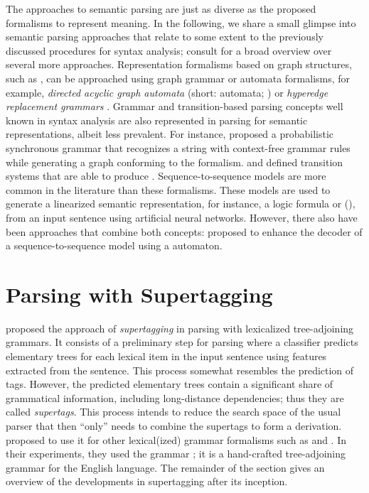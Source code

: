 \documentclass[../document.tex]{subfiles}
\begin{document}
    The approaches to semantic parsing are just as diverse as the proposed formalisms to represent meaning.
    In the following, we share a small glimpse into semantic parsing approaches that relate to some extent to the previously discussed procedures for syntax analysis; consult \citet{kamath2018survey} for a broad overview over several more approaches.
    Representation formalisms based on graph structures, such as , can be approached using graph grammar or automata formalisms, for example, \emph{directed acyclic graph automata} (short:  automata; \citealp{fancellu-etal-2019-semantic}) or \emph{hyperedge replacement grammars} \citep{drewes1997hyperedge}.
    Grammar and transition-based parsing concepts well known in syntax analysis are also represented in parsing for semantic representations, albeit less prevalent.
    For instance, \citet{peng2015synchronous} proposed a probabilistic synchronous grammar that recognizes a string with context-free grammar rules while generating a graph conforming to the  formalism.
     and \citet{vilares-gomez-rodriguez-2018-transition} defined transition systems that are able to produce .
    Sequence-to-sequence models are more common in the literature than these formalisms.
    These models are used to generate a linearized semantic representation, for instance, a logic formula \citep{dong-lapata-2016-language} or  (\citep{zhang-etal-2019-amr}), from an input sentence using artificial neural networks.
    However, there also have been approaches that combine both concepts:  proposed to enhance the decoder of a sequence-to-sequence model using a  automaton.

    \section{Parsing with Supertagging}\label{sec:literature:supertagging}
     proposed the approach of \emph{supertagging} in parsing with lexicalized tree-adjoining grammars.
    It consists of a preliminary step for parsing where a classifier predicts elementary trees for each lexical item in the input sentence using features extracted from the sentence.
    This process somewhat resembles the prediction of  tags.
    However, the predicted elementary trees contain a significant share of grammatical information, including long-distance dependencies; thus they are called \emph{supertags}.
    This process intends to reduce the search space of the usual parser that then ``only'' needs to combine the supertags to form a derivation.
     proposed to use it for other lexical(ized) grammar formalisms such as  and .
    In their experiments, they used the  grammar \citep{xtag01}; it is a hand-crafted tree-adjoining grammar for the English language.
    The remainder of the section gives an overview of the developments in supertagging after its inception.
\end{document}
